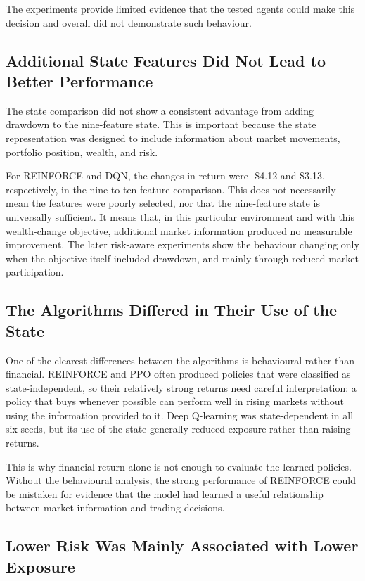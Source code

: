 The experiments provide limited evidence that the tested agents could
make this decision and overall did not demonstrate such behaviour.

\subsection{Additional State Features Did Not Lead to Better Performance}

The state comparison did not show a consistent advantage from adding
drawdown to the nine-feature state. This is important because the state
representation was designed to include information about market
movements, portfolio position, wealth, and risk.

For REINFORCE and DQN, the changes in return were -\$4.12 and \$3.13,
respectively, in the nine-to-ten-feature comparison. This does not
necessarily mean the features were poorly selected, nor that the
nine-feature state is universally sufficient. It means that, in this
particular environment and with this wealth-change objective, additional
market information produced no measurable improvement. The later
risk-aware experiments show the behaviour changing only when the
objective itself included drawdown, and mainly through reduced market
participation.

\subsection{The Algorithms Differed in Their Use of the State}

One of the clearest differences between the algorithms is behavioural
rather than financial. REINFORCE and PPO often produced policies that
were classified as state-independent, so their relatively strong returns
need careful interpretation: a policy that buys whenever possible can
perform well in rising markets without using the information provided to
it. Deep Q-learning was state-dependent in all six seeds, but its use of
the state generally reduced exposure rather than raising returns.

This is why financial return alone is not enough to evaluate the learned
policies. Without the behavioural analysis, the strong performance of
REINFORCE could be mistaken for evidence that the model had learned a
useful relationship between market information and trading decisions.

\subsection{Lower Risk Was Mainly Associated with Lower Exposure}


